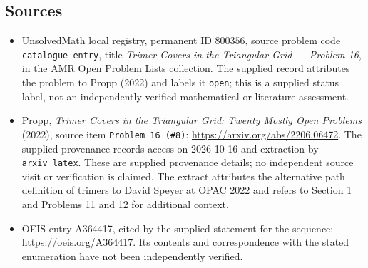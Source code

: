 \documentclass[11pt]{article}
\begin{document}
\subsection{Sources}
\begin{itemize}
\item UnsolvedMath local registry, permanent ID \(800356\), source problem code \texttt{catalogue entry}, title \emph{Trimer Covers in the Triangular Grid --- Problem 16}, in the AMR Open Problem Lists collection. The supplied record attributes the problem to Propp (2022) and labels it \texttt{open}; this is a supplied status label, not an independently verified mathematical or literature assessment.
\item Propp, \emph{Trimer Covers in the Triangular Grid: Twenty Mostly Open Problems} (2022), source item \texttt{Problem 16 (\#8)}: \url{https://arxiv.org/abs/2206.06472}. The supplied provenance records access on 2026-10-16 and extraction by \texttt{arxiv\_latex}. These are supplied provenance details; no independent source visit or verification is claimed. The extract attributes the alternative path definition of trimers to David Speyer at OPAC 2022 and refers to Section 1 and Problems 11 and 12 for additional context.
\item OEIS entry A364417, cited by the supplied statement for the sequence: \url{https://oeis.org/A364417}. Its contents and correspondence with the stated enumeration have not been independently verified.
\end{itemize}
\end{document}
